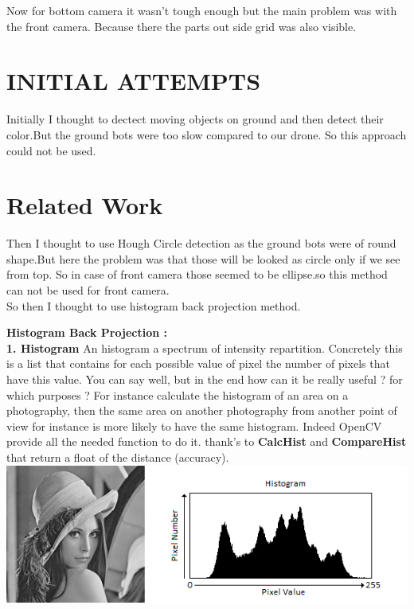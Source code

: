 \documentclass[letterpaper, 10 pt, conference]{ieeeconf}
\begin{document}
 Now for bottom camera it wasn't tough enough but the main problem was with the front camera. Because there the parts out side grid was also visible.

\section{INITIAL ATTEMPTS}

Initially I thought to dectect moving objects on ground and then detect their color.But the ground bots were too slow compared to our drone. So this approach could not be used.

\section{Related Work}

Then I thought to use Hough Circle detection as the ground bots were of round shape.But here the problem was that those will be looked as circle only if we see from top. So in case of front camera those seemed to be ellipse.so this method can not be used for front camera.\\

So then I thought to use histogram back projection method.

\textbf{ Histogram Back Projection : }
\\
 \textbf{1. Histogram }
An histogram a spectrum of intensity repartition. Concretely this is a list that contains for each possible value of pixel the number of pixels that have this value. You can say well, but in the end how can it be really useful ? for which purposes ? For instance calculate the histogram of an area on a photography, then the same area on another photography from another point of view for instance is more likely to have the same histogram. Indeed OpenCV provide all the needed function to do it. thank’s to \textbf{CalcHist} and \textbf{ CompareHist} that return a float of the distance (accuracy). \\

\includegraphics [scale =0.55 ] {lennaWithHist.png}
\end{document}
